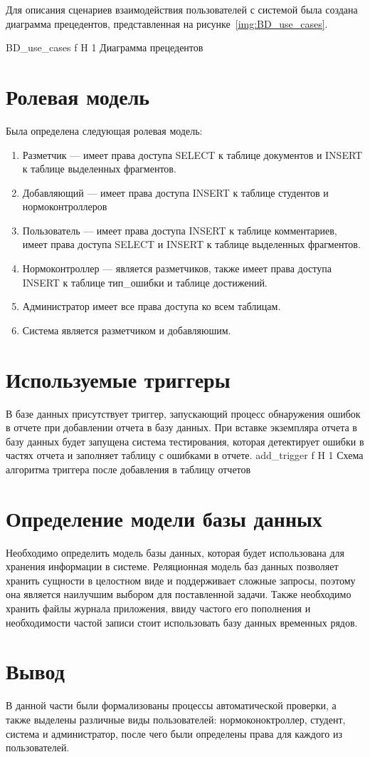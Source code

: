 Для описания сценариев взаимодействия пользователей с системой была создана диаграмма прецедентов, представленная на рисунке~\ref{img:BD_use_cases}.

{BD_use_cases} %
{f} %
{H} %
{1\textwidth} %
{Диаграмма прецедентов} %


\section{Ролевая модель}
Была определена следующая ролевая модель:
\begin{enumerate}
	\item Разметчик --- имеет права доступа SELECT к таблице документов и INSERT к таблице выделенных фрагментов.
	\item Добавляющий --- имеет права доступа INSERT к таблице студентов и нормоконтроллеров
	\item Пользователь --- имеет права доступа INSERT к таблице комментариев, имеет права доступа SELECT  и INSERT к таблице выделенных фрагментов.
	\item Нормоконтроллер --- является разметчиков, также имеет права доступа INSERT к таблице тип\_ошибки и таблице достижений.
	\item Администратор имеет все права доступа ко всем таблицам.
	\item Система является разметчиком и добавляюшим.
\end{enumerate}
\section{Используемые триггеры}
В базе данных присутствует триггер, запускающий процесс обнаружения ошибок в отчете при добавлении отчета в базу данных. При вставке экземпляра отчета в базу данных будет запущена система тестирования, которая детектирует ошибки в частях отчета и заполняет таблицу с ошибками в отчете. 
{add_trigger} %
{f} %
{H} %
{1\textwidth} %
{Схема алгоритма триггера после добавления в таблицу отчетов} %

\section{Определение модели базы данных}
Необходимо определить модель базы данных, которая будет использована для хранения информации в системе. Реляционная модель баз данных позволяет хранить сущности в целостном виде и поддерживает сложные запросы, поэтому она является наилучшим выбором для поставленной задачи. Также необходимо хранить файлы журнала приложения, ввиду частого его пополнения и необходимости частой записи стоит использовать базу данных временных рядов.

\section*{Вывод}
В данной части были формализованы процессы автоматической проверки, а также выделены различные виды пользователей: нормоконоктроллер, студент, система и администратор, после чего были определены права для каждого из пользователей.




